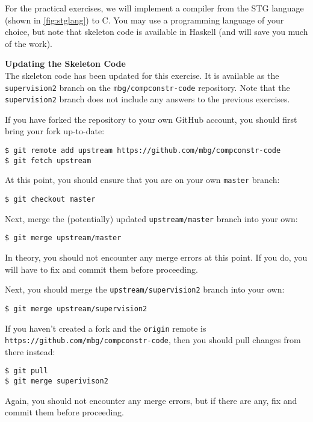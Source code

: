 \documentclass[10pt,a4paper]{exam} %
\begin{document}
For the practical exercises, we will implement a compiler from the STG language (shown in \autoref{fig:stglang}) to C. You may use a programming language of your choice, but note that skeleton code is available in Haskell (and will save you much of the work). 

\begin{mdframed}
\textbf{Updating the Skeleton Code}\\
The skeleton code has been updated for this exercise. It is available as the \texttt{supervision2} branch on the \texttt{mbg/compconstr-code} repository. Note that the \texttt{supervision2} branch does not include any answers to the previous exercises. 

If you have forked the repository to your own GitHub account, you should first bring your fork up-to-date:
\begin{verbatim}
$ git remote add upstream https://github.com/mbg/compconstr-code
$ git fetch upstream
\end{verbatim}
At this point, you should ensure that you are on your own \texttt{master} branch:
\begin{verbatim}
$ git checkout master
\end{verbatim}
Next, merge the (potentially) updated \texttt{upstream/master} branch into your own:
\begin{verbatim}
$ git merge upstream/master
\end{verbatim}
In theory, you should not encounter any merge errors at this point. If you do, you will have to fix and commit them before proceeding.

Next, you should merge the \texttt{upstream/supervision2} branch into your own:
\begin{verbatim}
$ git merge upstream/supervision2
\end{verbatim}
If you haven't created a fork and the \texttt{origin} remote is \texttt{https://github.com/mbg/compconstr-code}, then you should pull changes from there instead:
\begin{verbatim}
$ git pull
$ git merge superivison2
\end{verbatim}
Again, you should not encounter any merge errors, but if there are any, fix and commit them before proceeding. 


\end{mdframed}
\end{document}
